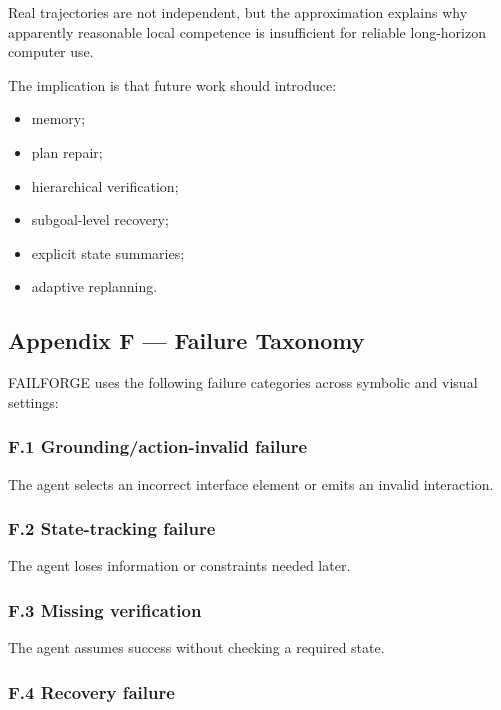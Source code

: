 \documentclass[
]{article}
\providecommand{\tightlist}{%
  \setlength{\itemsep}{0pt}\setlength{\parskip}{0pt}}
\begin{document}
Real trajectories are not independent, but the approximation explains
why apparently reasonable local competence is insufficient for reliable
long-horizon computer use.

The implication is that future work should introduce:

\begin{itemize}
\tightlist
\item
  memory;
\item
  plan repair;
\item
  hierarchical verification;
\item
  subgoal-level recovery;
\item
  explicit state summaries;
\item
  adaptive replanning.
\end{itemize}

\subsection{Appendix F --- Failure
Taxonomy}\label{appendix-f-failure-taxonomy}

FAILFORGE uses the following failure categories across symbolic and
visual settings:

\subsubsection{F.1 Grounding/action-invalid
failure}\label{f.1-groundingaction-invalid-failure}

The agent selects an incorrect interface element or emits an invalid
interaction.

\subsubsection{F.2 State-tracking
failure}\label{f.2-state-tracking-failure}

The agent loses information or constraints needed later.

\subsubsection{F.3 Missing verification}\label{f.3-missing-verification}

The agent assumes success without checking a required state.

\subsubsection{F.4 Recovery failure}\label{f.4-recovery-failure}
\end{document}
